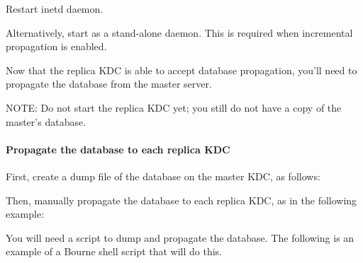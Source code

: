 \documentclass[letterpaper,10pt,english]{sphinxmanual}
\begin{document}
Restart inetd daemon.

Alternatively, start {\hyperref[\detokenize{admin/admin_commands/kpropd:kpropd-8}]{}} as a stand-alone daemon.  This is
required when incremental propagation is enabled.

Now that the replica KDC is able to accept database propagation,
you’ll need to propagate the database from the master server.

NOTE: Do not start the replica KDC yet; you still do not have a copy
of the master’s database.


\paragraph{Propagate the database to each replica KDC}
\label{\detokenize{admin/install_kdc:kprop-to-replicas}}\label{\detokenize{admin/install_kdc:propagate-the-database-to-each-replica-kdc}}
First, create a dump file of the database on the master KDC, as
follows:

%
\begin{sphinxVerbatim}[commandchars=\\\{\}]
   
\end{sphinxVerbatim}

Then, manually propagate the database to each replica KDC, as in the
following example:

%
\begin{sphinxVerbatim}[commandchars=\\\{\}]
    

    
\end{sphinxVerbatim}

You will need a script to dump and propagate the database. The
following is an example of a Bourne shell script that will do this.
\end{document}
